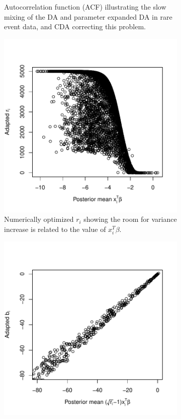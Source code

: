 \documentclass[10pt]{article}
\newcommand{\xbeta}{ x_i^T \beta}
\begin{document}
\begin{figure}[H]
\begin{subfigure}[b]{0.49\textwidth}
  \caption{Autocorrelation function (ACF) illustrating the slow mixing of the DA and parameter expanded DA in rare event data, and CDA correcting this problem.}
\end{subfigure}
   \begin{subfigure}[b]{0.49\textwidth}
 \includegraphics[width=1\textwidth]{probit_cda_r}
  \caption{Numerically optimized $r_i$ showing the room for variance increase is related to the  value of $\xbeta$.}
\end{subfigure}
  \begin{subfigure}[b]{0.49\textwidth}
 \includegraphics[width=1\textwidth]{probit_cda_b}

\end{subfigure}
\end{figure}
\end{document}
